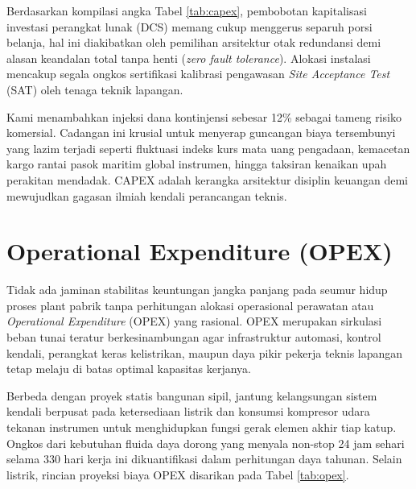\documentclass[12pt, a4paper]{report}
\begin{document}
Berdasarkan kompilasi angka Tabel \ref{tab:capex}, pembobotan kapitalisasi investasi perangkat lunak (DCS) memang cukup menggerus separuh porsi belanja, hal ini diakibatkan oleh pemilihan arsitektur otak redundansi demi alasan keandalan total tanpa henti (\textit{zero fault tolerance}). Alokasi instalasi mencakup segala ongkos sertifikasi kalibrasi pengawasan \textit{Site Acceptance Test} (SAT) oleh tenaga teknik lapangan.

Kami menambahkan injeksi dana kontinjensi sebesar 12\% sebagai tameng risiko komersial. Cadangan ini krusial untuk menyerap guncangan biaya tersembunyi yang lazim terjadi seperti fluktuasi indeks kurs mata uang pengadaan, kemacetan kargo rantai pasok maritim global instrumen, hingga taksiran kenaikan upah perakitan mendadak. CAPEX adalah kerangka arsitektur disiplin keuangan demi mewujudkan gagasan ilmiah kendali perancangan teknis.

\section{Operational Expenditure (OPEX)}
Tidak ada jaminan stabilitas keuntungan jangka panjang pada seumur hidup proses plant pabrik tanpa perhitungan alokasi operasional perawatan atau \textit{Operational Expenditure} (OPEX) yang rasional. OPEX merupakan sirkulasi beban tunai teratur berkesinambungan agar infrastruktur automasi, kontrol kendali, perangkat keras kelistrikan, maupun daya pikir pekerja teknis lapangan tetap melaju di batas optimal kapasitas kerjanya.

Berbeda dengan proyek statis bangunan sipil, jantung kelangsungan sistem kendali berpusat pada ketersediaan listrik dan konsumsi kompresor udara tekanan instrumen untuk menghidupkan fungsi gerak elemen akhir tiap katup. Ongkos dari kebutuhan fluida daya dorong yang menyala non-stop 24 jam sehari selama 330 hari kerja ini dikuantifikasi dalam perhitungan daya tahunan. Selain listrik, rincian proyeksi biaya OPEX disarikan pada Tabel \ref{tab:opex}.
\end{document}
